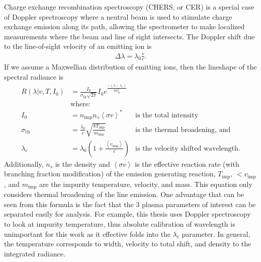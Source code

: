 Charge exchange recombination spectroscopy (CHERS, or CER) is a special case of Doppler spectroscopy where a neutral beam is used to stimulate charge exchange emission along its path, allowing the spectrometer to make localized measurements where the beam and line of sight intersects. The Doppler shift due to the line-of-sight velocity of an emitting ion is 
\begin{align}
    \Delta\lambda = \lambda_0 \frac{v}{c}.
\end{align}
If we assume a Maxwellian distribution of emitting ions, then the lineshape of the spectral radiance is 
\begin{align}
    R(\lambda | v, T, I_0) &= \frac{I_0}{\sigma_\text{th} \sqrt{2\pi}}I_0 e^{\frac{-(\lambda-\lambda_c)}{2\sigma_\text{th}^2}}\\
    &\text{where:}\\
    I_0 &= n_{\text{imp}}n_s \left< \sigma v \right>^* &\text{is the total intensity}\\
    \sigma_\text{th} &= \frac{\lambda_0}{c}\sqrt{\frac{kT_\text{imp}}{m_{\text{imp}}}} &\text{is the thermal broadening, and}\\
    \lambda_c &= \lambda_0(1+\frac{\left< v_\text{imp} \right>}{c}) &\text{is the velocity shifted wavelength.}
\end{align}
Additionally, $n_s$ is the density and $\left<\sigma v\right>$ is the effective reaction rate (with branching fraction modification) of the emission generating reaction, $T_\text{imp}$, $<v_\text{imp}$, and $m_\text{imp}$ are the impurity temperature, velocity, and mass. This equation only considers thermal broadening of the line emission. One advantage that can be seen from this formula is the fact that the 3 plasma parameters of interest can be separated easily for analysis. For example, this thesis uses Doppler spectroscopy to look at impurity temperature, thus absolute calibration of wavelength is unimportant for this work as it effective folds into the $\lambda_c$ parameter. In general, the temperature corresponds to width, velocity to total shift, and density to the integrated radiance. 

